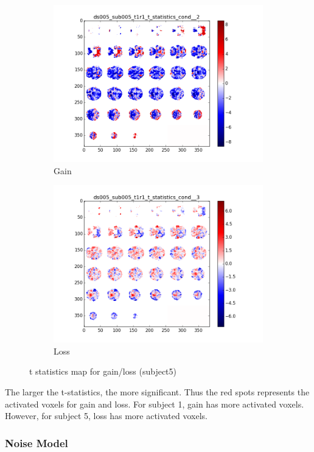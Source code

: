 \begin{figure}[H]
\begin{subfigure}{.5\textwidth}
  \centering
  \includegraphics[width=.8\linewidth]{../fig/t_test/ds005_sub005_t1r1_t-test_cond2.png}
  \caption{Gain}
  \label{fig:sfig1}
\end{subfigure}%
\begin{subfigure}{.5\textwidth}
  \centering
  \includegraphics[width=.8\linewidth]{../fig/t_test/ds005_sub005_t1r1_t-test_cond3.png}
  \caption{Loss}
  \label{fig:sfig2}
\end{subfigure}
\caption{t statistics map for gain/loss (subject5)}
\label{fig:fig}
\end{figure}
\noindent
The larger the t-statistics, the more significant. Thus the red spots represents the activated voxels for gain and loss. For subject 1, gain has more activated voxels. However, for subject 5, loss has more activated voxels.

\subsubsection {Noise Model}

